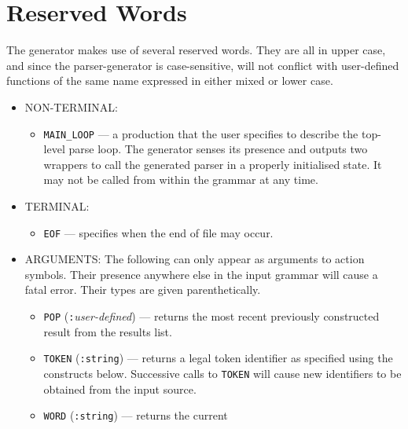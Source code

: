\section{Reserved Words}\label{reserved}

The generator makes use of several reserved words.  They are all in upper case,
and since the parser-generator is case-sensitive, will not conflict with
user-defined functions of the same name expressed in either mixed or lower
case.

  \begin{itemize}
     \item {\small NON-TERMINAL:} $\;$
     \begin{itemize}
     \item \verb"MAIN_LOOP"     
        \normalsize---
        a production that the user 
        specifies to describe the top-level parse loop.  The generator senses
        its presence and outputs two wrappers to call the generated parser 
        in a properly initialised state.  It
        may not be called from within the grammar at any time.
     \end{itemize}
     \item {\small TERMINAL:} $\;$
     \begin{itemize}
     \item \verb"EOF"            \normalsize--- 
        specifies when the end of file may occur.
     \end{itemize}
     \item {\small ARGUMENTS:} The following can only appear as arguments
        to action symbols.  Their presence anywhere else in the input grammar
        will cause a fatal error.  Their types are given parenthetically.
     \begin{itemize}
     \item \verb"POP" (\verb":"{\it user-defined})
         \normalsize--- 
         returns the most recent previously constructed result from the results
         list.
     \item \verb"TOKEN" (\verb":string") 
         \normalsize--- returns a legal
         token identifier as specified using the constructs below.  Successive
         calls to \verb"TOKEN" will cause new identifiers to be obtained
         from the input source.
     \item \verb"WORD" (\verb":string") 
         \normalsize--- returns the current

\end{itemize}
\end{itemize}
